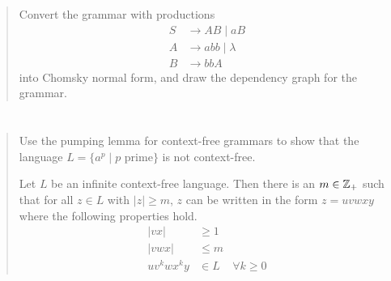 \documentclass{article}
\begin{document}
\section{}
\begin{quote}
    Convert the grammar with productions
    \begin{align*}
        S & \to AB \mid aB       \\
        A & \to abb \mid \lambda \\
        B & \to bbA
    \end{align*}
    into Chomsky normal form, and draw the dependency graph for the grammar.
\end{quote}

\section{}
\begin{quote}
    Use the pumping lemma for context-free grammars to show that the language $L = \{a^p \mid p \text{ prime}\}$ is not context-free.

    \begin{lemma}
        Let $L$ be an infinite context-free language.
        Then there is an $m \in \mathbb{Z}_+$ such that for all $z \in L$ with $\vert z \vert \geq m$, $z$ can be written in the form $z = uvwxy$ where the following properties hold.
        \begin{align*}
            \vert vx \vert  & \geq 1                    \\
            \vert vwx \vert & \leq m                    \\
            u v^k w x^k y   & \in L  & \forall k \geq 0
        \end{align*}
    \end{lemma}
\end{quote}
\end{document}
